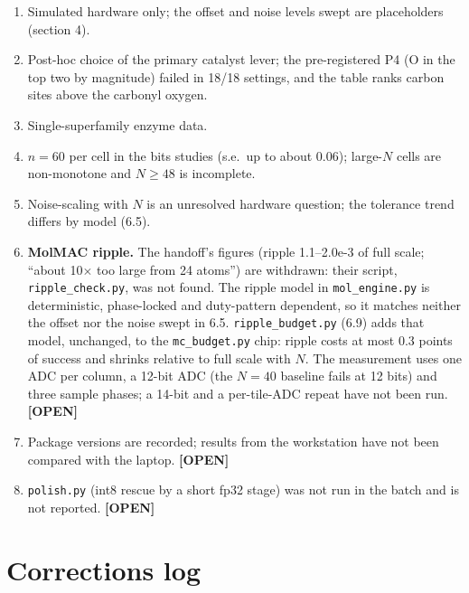 \documentclass[11pt]{article}
\newcommand{\x}{$\times$}
\newcommand{\OPEN}{\textbf{[OPEN]}}
\newcommand{\scr}[1]{\texttt{#1}}
\begin{document}
\begin{enumerate}
  \item Simulated hardware only; the offset and noise levels swept are placeholders (section 4).
  \item Post-hoc choice of the primary catalyst lever; the pre-registered P4 (O in the top two by magnitude) failed in 18/18 settings, and the table ranks carbon sites above the carbonyl oxygen.
  \item Single-superfamily enzyme data.
  \item $n = 60$ per cell in the bits studies (s.e.\ up to about 0.06); large-$N$ cells are non-monotone and $N \geq 48$ is incomplete.
  \item Noise-scaling with $N$ is an unresolved hardware question; the tolerance trend differs by model (6.5).
  \item \textbf{MolMAC ripple.} The handoff's figures (ripple 1.1--2.0e-3 of full scale; ``about 10\x{} too large from 24 atoms'') are withdrawn: their script, \scr{ripple\_check.py}, was not found. The ripple model in \scr{mol\_engine.py} is deterministic, phase-locked and duty-pattern dependent, so it matches neither the offset nor the noise swept in 6.5. \scr{ripple\_budget.py} (6.9) adds that model, unchanged, to the \scr{mc\_budget.py} chip: ripple costs at most 0.3 points of success and shrinks relative to full scale with $N$. The measurement uses one ADC per column, a 12-bit ADC (the $N = 40$ baseline fails at 12 bits) and three sample phases; a 14-bit and a per-tile-ADC repeat have not been run. \OPEN
  \item Package versions are recorded; results from the workstation have not been compared with the laptop. \OPEN
  \item \scr{polish.py} (int8 rescue by a short fp32 stage) was not run in the batch and is not reported. \OPEN
\end{enumerate}

\section{Corrections log}
\end{document}
